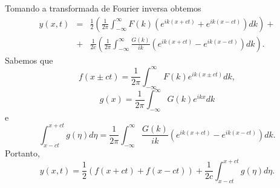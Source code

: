 Tomando a transformada de Fourier inversa obtemos
\begin{eqnarray*}
y(x,t)&=&\frac{1}{2}\left(\frac{1}{2
\pi}\int_{-\infty}^\infty
F(k)(e^{ik(x+ct)}+e^{ik(x-ct)})dk\right)+\\&+&\frac{1}{2c}\left(\frac{1}{2
\pi}\int_{-\infty}^\infty
\frac{G(k)}{ik}(e^{ik(x+ct)}-e^{ik(x-ct)})dk \right).
\end{eqnarray*}
Sabemos que
\begin{equation*}
f(x\pm ct)=\frac{1}{2\pi}\int_{-\infty}^\infty
F(k)e^{ik (x\pm ct)}dk,
\end{equation*}
\begin{equation*}
g(x)=\frac{1}{2\pi}\int_{-\infty}^\infty G(k)e^{ik
x}dk
\end{equation*}
e
\begin{equation*}
\int_{x-ct}^{x+ct}
g(\eta)d\eta=\frac{1}{2\pi}\int_{-\infty}^\infty
\frac{G(k)}{i k} (e^{ik(x+ct)}-e^{ik(x-ct)})dk.
\end{equation*}
Portanto,
\begin{equation*}
y(x,t)=\frac{1}{2} \left( f(x+ct)+f(x-ct)
\right)+\frac{1}{2c}\int_{x-ct}^{x+ct}g(\eta)d\eta.
\end{equation*}


